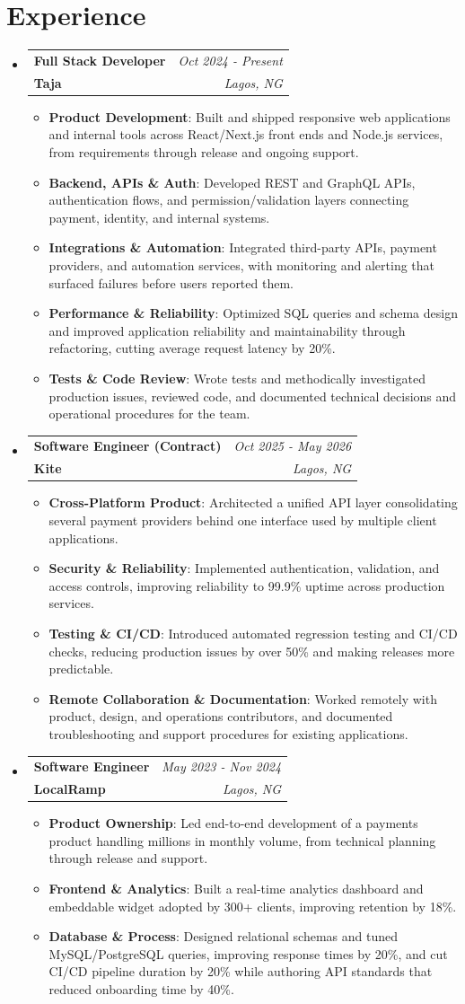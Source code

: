 \documentclass[a4paper]{article}
\makeatletter
\newcommand{\resumeItem}[2]{ \item\small{ \textbf{#1}: #2 } }
\newcommand{\resumeJobHeading}[4]{ %
\vspace{2pt}
\item[]
\begin{tabular*}{0.97\textwidth}{l@{\extracolsep{\fill}}r}
	\textbf{#1} & \textit{#3} \\
	\textbf{#4} & \textit{#2} \\
\end{tabular*}
\vspace{0pt}
}
\newcommand{\resumeSubHeadingListStart}{\begin{itemize}[leftmargin=*,topsep=1pt]}
\newcommand{\resumeSubHeadingListEnd}{\end{itemize}}
\newcommand{\resumeItemListStart}{\begin{itemize}[topsep=0pt,itemsep=0pt,parsep=0pt]}
\newcommand{\resumeItemListEnd}{\end{itemize}}
\makeatother
\begin{document}
	\vspace{4pt}
	\section{Experience}
	\resumeSubHeadingListStart
	\resumeJobHeading{Full Stack Developer}{Lagos, NG}{Oct 2024 - Present}{Taja}
	\resumeItemListStart
	\resumeItem{Product Development}
	{Built and shipped responsive web applications and internal tools across React/Next.js front ends and Node.js services, from requirements through release and ongoing support.}
	\resumeItem{Backend, APIs \& Auth}
	{Developed REST and GraphQL APIs, authentication flows, and permission/validation layers connecting payment, identity, and internal systems.}
	\resumeItem{Integrations \& Automation}
	{Integrated third-party APIs, payment providers, and automation services, with monitoring and alerting that surfaced failures before users reported them.}
	\resumeItem{Performance \& Reliability}
	{Optimized SQL queries and schema design and improved application reliability and maintainability through refactoring, cutting average request latency by 20\%.}
	\resumeItem{Tests \& Code Review}
	{Wrote tests and methodically investigated production issues, reviewed code, and documented technical decisions and operational procedures for the team.}
	\resumeItemListEnd

	\resumeJobHeading{Software Engineer (Contract)}{Lagos, NG}{Oct 2025 - May 2026}{Kite}
	\resumeItemListStart
	\resumeItem{Cross-Platform Product}
	{Architected a unified API layer consolidating several payment providers behind one interface used by multiple client applications.}
	\resumeItem{Security \& Reliability}
	{Implemented authentication, validation, and access controls, improving reliability to 99.9\% uptime across production services.}
	\resumeItem{Testing \& CI/CD}
	{Introduced automated regression testing and CI/CD checks, reducing production issues by over 50\% and making releases more predictable.}
	\resumeItem{Remote Collaboration \& Documentation}
	{Worked remotely with product, design, and operations contributors, and documented troubleshooting and support procedures for existing applications.}
	\resumeItemListEnd

	\resumeJobHeading{Software Engineer}{Lagos, NG}{May 2023 - Nov 2024}{LocalRamp}
	\resumeItemListStart
	\resumeItem{Product Ownership}
	{Led end-to-end development of a payments product handling millions in monthly volume, from technical planning through release and support.}
	\resumeItem{Frontend \& Analytics}
	{Built a real-time analytics dashboard and embeddable widget adopted by 300+ clients, improving retention by 18\%.}
	\resumeItem{Database \& Process}
	{Designed relational schemas and tuned MySQL/PostgreSQL queries, improving response times by 20\%, and cut CI/CD pipeline duration by 20\% while authoring API standards that reduced onboarding time by 40\%.}
	\resumeItemListEnd
	\resumeSubHeadingListEnd
\end{document}
